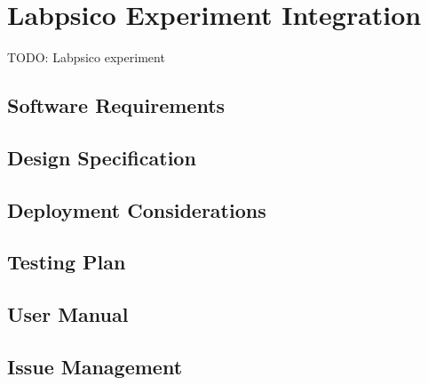 \section{Labpsico Experiment Integration}

TODO: Labpsico experiment

\subsection{Software Requirements}

\subsection{Design Specification}

\subsection{Deployment Considerations}

\subsection{Testing Plan}

\subsection{User Manual}

\subsection{Issue Management}
